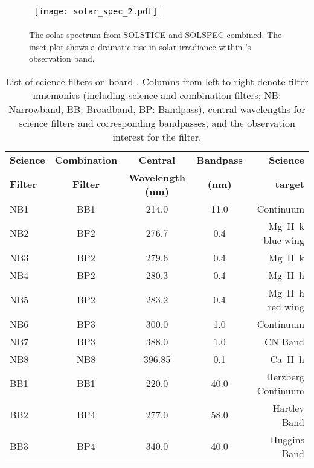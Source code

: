 \begin{figure}[ht!]
    \begin{center}
    \begin{tabular}{c}
    \texttt{[image: solar\_spec\_2.pdf]}
    \end{tabular}
    \end{center}
\caption{The solar spectrum from SOLSTICE and SOLSPEC combined. The inset plot shows a dramatic rise in solar irradiance within \suit's observation band.} 
\label{fig:sun_spec} 
\end{figure} 


\begin{table*}[ht!]
\begin{center}
\begin{tabular}{||l|c|c|c|r||}
\hline
\textbf{Science}  &	\textbf{Combination} &	\textbf{Central} & \textbf{Bandpass} &\textbf{Science} \\
\textbf{Filter}	&	\textbf{Filter}     &	\textbf{Wavelength  (nm)}	&		\textbf{(nm)	}	   	&\textbf{target}		\\
\hline
NB1     & BB1 		& 214.0 		    & 11.0 		& Continuum\\
NB2 	& BP2		& 276.7				& 0.4 		& Mg~\rm{II}~k blue wing \\
NB3 	& BP2		& 279.6 			& 0.4 		& Mg~\rm{II}~k\\
NB4 	& BP2		& 280.3				& 0.4 		& Mg~\rm{II}~h\\
NB5		& BP2		& 283.2				& 0.4 		& Mg~\rm{II}~h red wing\\
NB6 	& BP3		& 300.0 			&1.0 		& Continuum\\
NB7 	& BP3		& 388.0				&1.0 		& CN Band\\
NB8		& NB8		& 396.85 			& 0.1 		& Ca~\rm{II}~h\\
BB1 	& BB1		& 220.0				& 40.0		& Herzberg Continuum \\
BB2 	& BP4		& 277.0 			& 58.0       & Hartley Band\\
BB3 	& BP4		& 340.0				& 40.0        & Huggins Band\\
\hline
\end{tabular}
\end{center}
\caption{List of science filters on board \suit. Columns from left to right denote filter mnemonics (including science and combination filters; NB: Narrowband, BB: Broadband, BP: Bandpass), central wavelengths for science filters and corresponding bandpasses, and the observation interest for the filter.} 
\label{tab:science_filters}
\end{table*}






